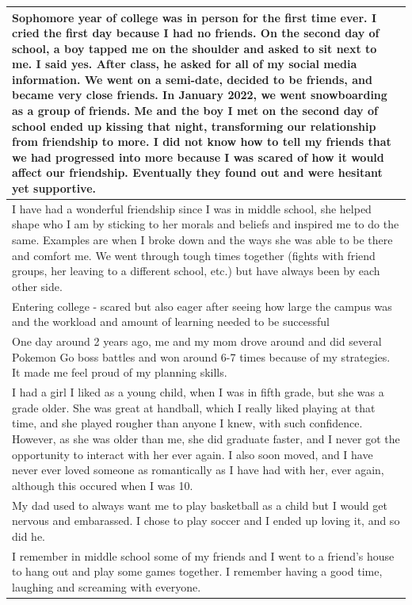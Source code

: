 \documentclass[
  .7em,
  letterpaper,
  DIV=11,
  numbers=noendperiod]{scrartcl}
\begin{document}
\begin{table}
\begin{tabular}{l}
\hline
Sophomore year of college was in person for the first time ever. I cried the first day because I had no friends. On the second day of school, a boy tapped me on the shoulder and asked to sit next to me. I said yes. After class, he asked for all of my social media information. We went on a semi-date, decided to be friends, and became very close friends. In January 2022, we went snowboarding as a group of friends. Me and the boy I met on the second day of school ended up kissing that night, transforming our relationship from friendship to more. I did not know how to tell my friends that we had progressed into more because I was scared of how it would affect our friendship. Eventually they found out and were hesitant yet supportive.\\
\hline
I have had a wonderful friendship since I was in middle school, she helped shape who I am by sticking to her morals and beliefs and inspired me to do the same. Examples are when I broke down and the ways she was able to be there and comfort me. We went through tough times together (fights with friend groups, her leaving to a different school, etc.) but have always been by each other side.\\
\hline
Entering college - scared but also eager after seeing how large the campus was and the workload and amount of learning needed to be successful\\
\hline
One day around 2 years ago, me and my mom drove around and did several Pokemon Go boss battles and won around 6-7 times because of my strategies. It made me feel proud of my planning skills.\\
\hline
I had a girl I liked as a young child, when I was in fifth grade, but she was a grade older. She was great at handball, which I really liked playing at that time, and she played rougher than anyone I knew, with such confidence. However, as she was older than me, she did graduate faster, and I never got the opportunity to interact with her ever again. I also soon moved, and I have never ever loved someone as romantically as I have had with her, ever again, although this occured when I was 10.\\
\hline
My dad used to always want me to play basketball as a child but I would get nervous and embarassed. I chose to play soccer and I ended up loving it, and so did he.\\
\hline
I remember in middle school some of my friends and I went to a friend’s house to hang out and play some games together. I remember having a good time, laughing and screaming with everyone.\\

\end{tabular}
\end{table}
\end{document}
